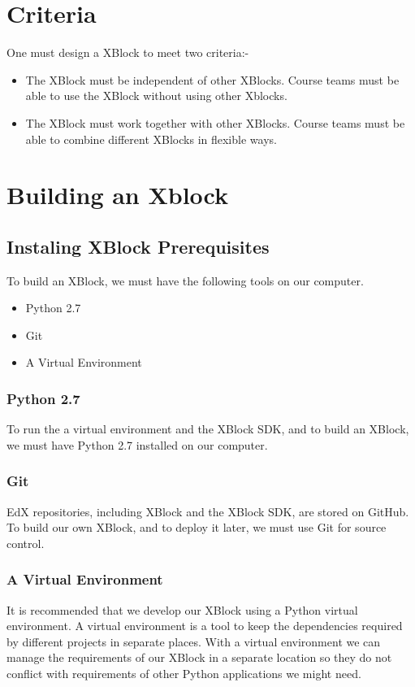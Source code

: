 \section{Criteria}
One must design a XBlock to meet two criteria:-
\begin{itemize}
\item The XBlock must be independent of other XBlocks. Course teams must be able to use the
XBlock without using other Xblocks.
\item The XBlock must work together with other XBlocks. Course teams must be able to combine
different XBlocks in flexible ways.
\end{itemize}

\section{Building an Xblock}
\subsection{Instaling XBlock Prerequisites}
To build an XBlock, we must have the following tools on our computer.
\begin{itemize}
\item Python 2.7
\item Git
\item A Virtual Environment
\end{itemize}
\subsubsection{Python 2.7}
To run the a virtual environment and the XBlock SDK, and to build an XBlock, we must
have Python 2.7 installed on our computer.
\subsubsection{Git}
EdX repositories, including XBlock and the XBlock SDK, are stored on GitHub. To build
our own XBlock, and to deploy it later, we must use Git for source control.
\subsubsection{A Virtual Environment}
It is recommended that we develop our XBlock using a Python virtual environment. A
virtual environment is a tool to keep the dependencies required by different projects in
separate places. With a virtual environment we can manage the requirements of our XBlock
in a separate location so they do not conflict with requirements of other Python applications
we might need.

